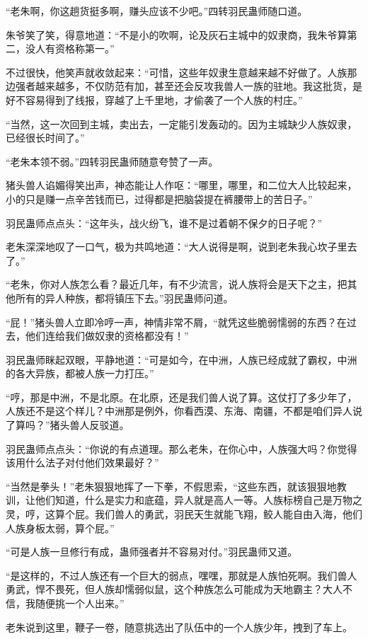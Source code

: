 \begin{this_body}
“老朱啊，你这趟货挺多啊，赚头应该不少吧。”四转羽民蛊师随口道。

朱爷笑了笑，得意地道：“不是小的吹啊，论及灰石主城中的奴隶商，我朱爷算第二，没人有资格称第一。”

不过很快，他笑声就收敛起来：“可惜，这些年奴隶生意越来越不好做了。人族那边强者越来越多，不仅防范有加，甚至还会反攻我兽人一族的驻地。我这批货，是好不容易得到了线报，穿越了上千里地，才偷袭了一个人族的村庄。”

“当然，这一次回到主城，卖出去，一定能引发轰动的。因为主城缺少人族奴隶，已经很长时间了。”

“老朱本领不弱。”四转羽民蛊师随意夸赞了一声。

猪头兽人谄媚得笑出声，神态能让人作呕：“哪里，哪里，和二位大人比较起来，小的只是赚一点辛苦钱而已，过得都是把脑袋提在裤腰带上的苦日子。”

羽民蛊师点点头：“这年头，战火纷飞，谁不是过着朝不保夕的日子呢？”

老朱深深地叹了一口气，极为共鸣地道：“大人说得是啊，说到老朱我心坎子里去了。”

“老朱，你对人族怎么看？最近几年，有不少流言，说人族将会是天下之主，把其他所有的异人种族，都将镇压下去。”羽民蛊师问道。

“屁！”猪头兽人立即冷哼一声，神情非常不屑，“就凭这些脆弱懦弱的东西？在过去，他们连给我们做奴隶的资格都没有！”

羽民蛊师眯起双眼，平静地道：“可是如今，在中洲，人族已经成就了霸权，中洲的各大异族，都被人族一力打压。”

“哼，那是中洲，不是北原。在北原，还是我们兽人说了算。这仗打了多少年了，人族还不是这个样儿？中洲那是例外，你看西漠、东海、南疆，不都是咱们异人说了算吗？”猪头兽人反驳道。

羽民蛊师点点头：“你说的有点道理。那么老朱，在你心中，人族强大吗？你觉得该用什么法子对付他们效果最好？”

“当然是拳头！”老朱狠狠地挥了一下拳，不假思索，“这些东西，就该狠狠地教训，让他们知道，什么是实力和底蕴，异人就是高人一等。人族标榜自己是万物之灵，哼，这算个屁。我们兽人的勇武，羽民天生就能飞翔，鲛人能自由入海，他们人族身板太弱，算个屁。”

“可是人族一旦修行有成，蛊师强者并不容易对付。”羽民蛊师又道。

“是这样的，不过人族还有一个巨大的弱点，嘿嘿，那就是人族怕死啊。我们兽人勇武，悍不畏死，但人族却懦弱似鼠，这个种族怎么可能成为天地霸主？大人不信，我随便挑一个人出来。”

老朱说到这里，鞭子一卷，随意挑选出了队伍中的一个人族少年，拽到了车上。


\end{this_body}
